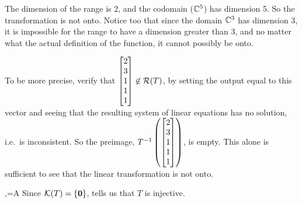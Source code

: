 %
{}
%
%
{The dimension of the range is 2, and the codomain (${\mathbb C}\sp{5}$) has dimension 5.  So the transformation is not onto.  Notice too that since the domain ${\mathbb C}\sp{3}$ has dimension 3, it is impossible for the range to have a dimension greater than 3, and no matter what the actual definition of the function, it cannot possibly be onto.\par
%
To be more precise, verify that $\begin{bmatrix}2\\3\\1\\1\\1\end{bmatrix}\not\in\mathcal{R}\!\protect\left(T\protect\right)$, by setting the output equal to this vector and seeing that the resulting system of linear equations has no solution, i.e.\ is inconsistent.  So the preimage, $T\sp{-1}\protect\left(\begin{bmatrix}2\\3\\1\\1\\1\end{bmatrix}\protect\right)$, is empty.  This alone is sufficient to see that the linear transformation is not onto.}
%
%
\ltmatrixrepresentation
{,\quad{}=A}
{}
%
\newpage
%
%
%
%
%
%
%
%
{Since $\mathcal{K}\!\protect\left(T\protect\right)=\protect\left\{{\bf0}\protect\right\}$,  tells us that $T$ is injective.}
%
\ltrange
{}
